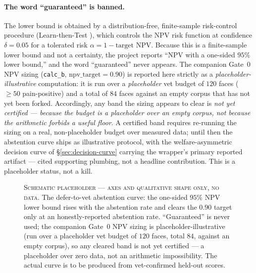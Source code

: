 \paragraph{The word ``guaranteed'' is banned.} The lower bound is obtained by a
distribution-free, finite-sample risk-control procedure (Learn-then-Test
\cite{angelopoulos2021ltt}), which controls the NPV risk function at confidence
$\delta = 0.05$ for a tolerated risk $\alpha = 1 - \text{target NPV}$. Because
this is a finite-sample lower bound and not a certainty, the project reports
``NPV with a one-sided $95\%$ lower bound,'' and the word ``guaranteed'' never
appears. The companion Gate~0 NPV sizing
(\texttt{calc\_b}, $\text{npv\_target}=0.90$) is reported here strictly as a
\emph{placeholder-illustrative} computation: it is run over a \emph{placeholder}
vet budget of $120$ faces ($\geq 50$ pain-positive) and a total of $84$ faces
against an empty corpus that has not yet been forked. Accordingly, any band the
sizing appears to clear is \emph{not yet certified --- because the budget is a
placeholder over an empty corpus, not because the arithmetic forbids a useful
floor}. A certified band requires re-running the sizing on a real,
non-placeholder budget over measured data; until then the abstention curve ships
as illustrative protocol, with the welfare-asymmetric decision curve of
\S\ref{sec:decision-curve} carrying the wrapper's primary reported artifact ---
cited supporting plumbing, not a headline contribution. This
is a placeholder status, not a kill.

\begin{figure}[t]
\centering
{}
\caption[One-sided NPV lower bound vs.\ abstention rate (schematic)]{\textsc{Schematic
placeholder --- axes and qualitative shape only, no data.} The defer-to-vet
abstention curve: the one-sided $95\%$ NPV lower bound rises with the abstention
rate and clears the $0.90$ target only at an honestly-reported abstention rate.
``Guaranteed'' is never used; the companion Gate~0 NPV sizing is
placeholder-illustrative (run over a placeholder vet budget of $120$ faces, total
$84$, against an empty corpus), so any cleared band is not yet certified --- a
placeholder over zero data, not an arithmetic impossibility. The actual curve is
to be produced from vet-confirmed held-out scores.}
\label{fig:abstention}
\end{figure}

